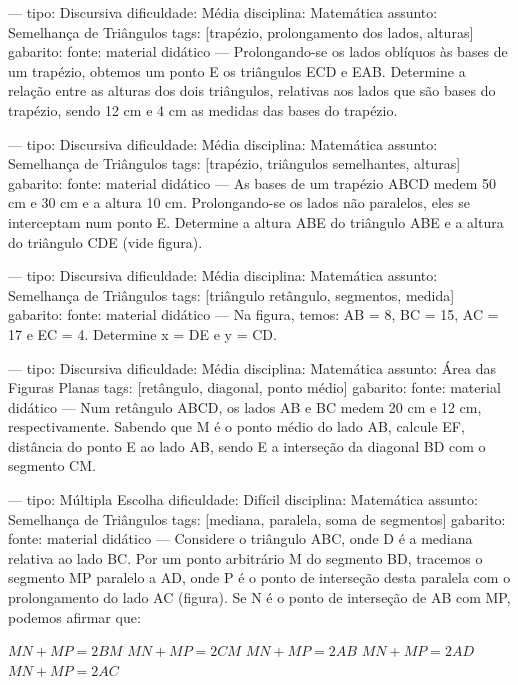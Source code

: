 ---
tipo: Discursiva
dificuldade: Média
disciplina: Matemática
assunto: Semelhança de Triângulos
tags: [trapézio, prolongamento dos lados, alturas]
gabarito:
fonte: material didático
---
\question
Prolongando-se os lados oblíquos às bases de um trapézio, obtemos um ponto E os triângulos ECD e EAB. Determine a relação entre as alturas dos dois triângulos, relativas aos lados que são bases do trapézio, sendo 12 cm e 4 cm as medidas das bases do trapézio.

---
tipo: Discursiva
dificuldade: Média
disciplina: Matemática
assunto: Semelhança de Triângulos
tags: [trapézio, triângulos semelhantes, alturas]
gabarito:
fonte: material didático
---
\question
As bases de um trapézio ABCD medem 50 cm e 30 cm e a altura 10 cm. Prolongando-se os lados não paralelos, eles se interceptam num ponto E. Determine a altura ABE do triângulo ABE e a altura do triângulo CDE (vide figura).


---
tipo: Discursiva
dificuldade: Média
disciplina: Matemática
assunto: Semelhança de Triângulos
tags: [triângulo retângulo, segmentos, medida]
gabarito:
fonte: material didático
---
\question
Na figura, temos: AB = 8, BC = 15, AC = 17 e EC = 4. Determine x = DE e y = CD.


---
tipo: Discursiva
dificuldade: Média
disciplina: Matemática
assunto: Área das Figuras Planas
tags: [retângulo, diagonal, ponto médio]
gabarito:
fonte: material didático
---
\question
Num retângulo ABCD, os lados AB e BC medem 20 cm e 12 cm, respectivamente. Sabendo que M é o ponto médio do lado AB, calcule EF, distância do ponto E ao lado AB, sendo E a interseção da diagonal BD com o segmento CM.


---
tipo: Múltipla Escolha
dificuldade: Difícil
disciplina: Matemática
assunto: Semelhança de Triângulos
tags: [mediana, paralela, soma de segmentos]
gabarito:
fonte: material didático
---
\question
Considere o triângulo ABC, onde D é a mediana relativa ao lado BC. Por um ponto arbitrário M do segmento BD, tracemos o segmento MP paralelo a AD, onde P é o ponto de interseção desta paralela com o prolongamento do lado AC (figura). Se N é o ponto de interseção de AB com MP, podemos afirmar que:
\begin{choices}
\choice $MN + MP = 2BM$
\choice $MN + MP = 2CM$
\choice $MN + MP = 2AB$
\choice $MN + MP = 2AD$
\choice $MN + MP = 2AC$
\end{choices}

